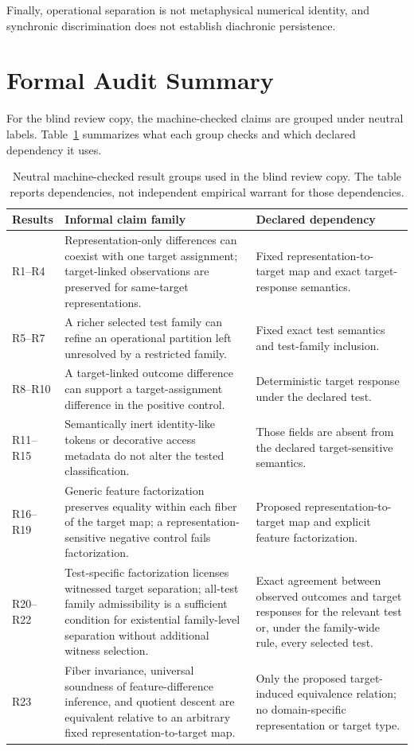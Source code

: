 \documentclass[12pt]{article}
\begin{document}
Finally, operational separation is not metaphysical numerical identity, and synchronic discrimination does not establish diachronic persistence.

\section{Formal Audit Summary}

For the blind review copy, the machine-checked claims are grouped under neutral labels. Table~\ref{tab:formal-audit} summarizes what each group checks and which declared dependency it uses.

\begin{table}[ht]
\centering
\begin{tabularx}{\textwidth}{@{}l >{\raggedright\arraybackslash}X >{\raggedright\arraybackslash}X@{}}
\toprule
\textbf{Results} & \textbf{Informal claim family} & \textbf{Declared dependency} \\
\midrule
R1--R4 & Representation-only differences can coexist with one target assignment; target-linked observations are preserved for same-target representations. & Fixed representation-to-target map and exact target-response semantics. \\
R5--R7 & A richer selected test family can refine an operational partition left unresolved by a restricted family. & Fixed exact test semantics and test-family inclusion. \\
R8--R10 & A target-linked outcome difference can support a target-assignment difference in the positive control. & Deterministic target response under the declared test. \\
R11--R15 & Semantically inert identity-like tokens or decorative access metadata do not alter the tested classification. & Those fields are absent from the declared target-sensitive semantics. \\
R16--R19 & Generic feature factorization preserves equality within each fiber of the target map; a representation-sensitive negative control fails factorization. & Proposed representation-to-target map and explicit feature factorization. \\
R20--R22 & Test-specific factorization licenses witnessed target separation; all-test family admissibility is a sufficient condition for existential family-level separation without additional witness selection. & Exact agreement between observed outcomes and target responses for the relevant test or, under the family-wide rule, every selected test. \\
R23 & Fiber invariance, universal soundness of feature-difference inference, and quotient descent are equivalent relative to an arbitrary fixed representation-to-target map. & Only the proposed target-induced equivalence relation; no domain-specific representation or target type. \\
\bottomrule
\end{tabularx}
\caption{Neutral machine-checked result groups used in the blind review copy. The table reports dependencies, not independent empirical warrant for those dependencies.}
\label{tab:formal-audit}
\end{table}
\end{document}
